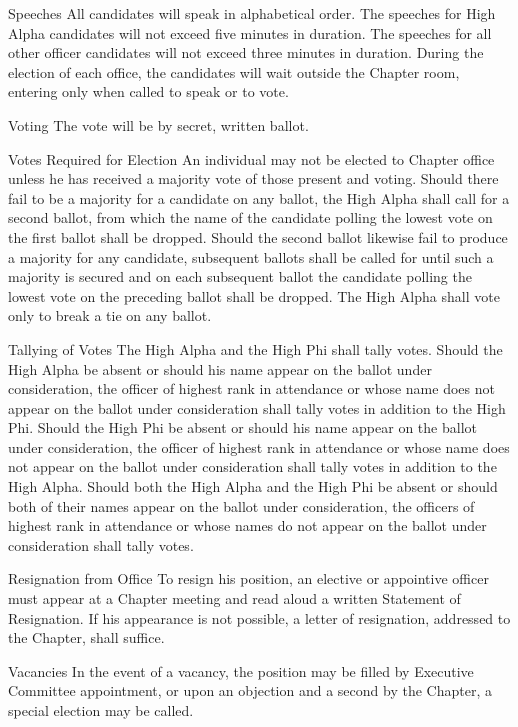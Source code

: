 \documentclass{article}
\begin{document}
\begin{subsubsectionList}
  \item {\titleStyle Speeches\titleSuffix}
  All candidates will speak in alphabetical order. The speeches for High Alpha
  candidates will not exceed five minutes in duration. The speeches for all
  other officer candidates will not exceed three minutes in duration. During the
  election of each office, the candidates will wait outside the Chapter room,
  entering only when called to speak or to vote.

  \item {\titleStyle Voting\titleSuffix}
  The vote will be by secret, written ballot.

  \item {\titleStyle Votes Required for Election\titleSuffix}
  An individual may not be elected to Chapter office unless he has received a
  majority vote of those present and voting. Should there fail to be a majority
  for a candidate on any ballot, the High Alpha shall call for a second ballot,
  from which the name of the candidate polling the lowest vote on the first
  ballot shall be dropped. Should the second ballot likewise fail to produce a
  majority for any candidate, subsequent ballots shall be called for until such
  a majority is secured and on each subsequent ballot the candidate polling the
  lowest vote on the preceding ballot shall be dropped. The High Alpha shall
  vote only to break a tie on any ballot.

  \item {\titleStyle Tallying of Votes\titleSuffix}
  The High Alpha and the High Phi shall tally votes. Should the High Alpha be
  absent or should his name appear on the ballot under consideration, the
  officer of highest rank in attendance or whose name does not appear on the
  ballot under consideration shall tally votes in addition to the High Phi.
  Should the High Phi be absent or should his name appear on the ballot under
  consideration, the officer of highest rank in attendance or whose name does
  not appear on the ballot under consideration shall tally votes in addition to
  the High Alpha. Should both the High Alpha and the High Phi be absent or
  should both of their names appear on the ballot under consideration, the
  officers of highest rank in attendance or whose names do not appear on the
  ballot under consideration shall tally votes.

  \item {\titleStyle Resignation from Office\titleSuffix}
  To resign his position, an elective or appointive officer must appear at a
  Chapter meeting and read aloud a written Statement of Resignation. If his
  appearance is not possible, a letter of resignation, addressed to the Chapter,
  shall suffice.

  \item {\titleStyle Vacancies\titleSuffix}
  In the event of a vacancy, the position may be filled by Executive Committee
  appointment, or upon an objection and a second by the Chapter, a special
  election may be called.
\end{subsubsectionList}
\end{document}
